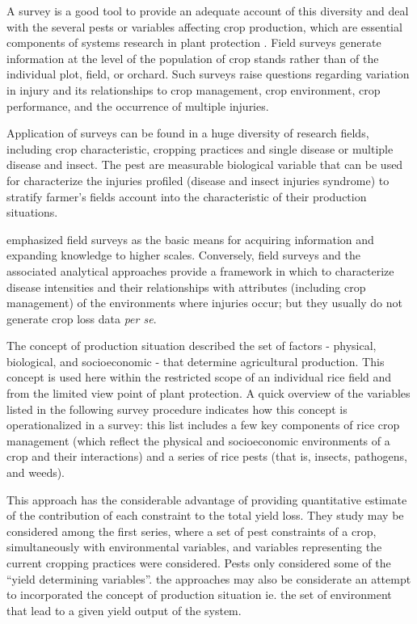 \documentclass[12pt, oneside]{report}
\begin{document}
A survey is a good tool to provide an adequate account of this diversity and deal with the several pests or variables affecting crop production, which are essential components of systems research in plant protection \citet{Zadoks:1979ts}. Field surveys generate information at the level of the population of crop stands rather than of the individual plot, field, or orchard. Such surveys raise questions regarding variation in injury and its relationships to crop management, crop environment, crop performance, and the occurrence of multiple injuries.

Application of surveys can be found in a huge diversity of research fields, including crop characteristic, cropping practices and single disease or multiple disease and insect. The pest are measurable biological variable that can be used for characterize the injuries profiled (disease and insect injuries syndrome) to stratify farmer's fields account into the characteristic of their production situations.

\cite{savary1995use} emphasized field surveys as the basic means for acquiring information and expanding knowledge to higher scales. Conversely, field surveys and the associated analytical approaches provide a framework in which to characterize disease intensities and their relationships with attributes (including crop management) of the environments where injuries occur; but they usually do not generate crop loss data \textit{per se}.

The concept of production situation described the set of factors - physical, biological, and socioeconomic - that determine agricultural production. This concept is used here within the restricted scope of an individual rice field and from the limited view point of plant protection. A quick overview of the variables listed in the following survey procedure indicates how this concept is operationalized in a survey: this list includes a few key components of rice crop management (which reflect the physical and socioeconomic environments of a crop and their interactions) and a series of rice pests (that is, insects, pathogens, and weeds).

This approach has the considerable advantage of providing quantitative estimate of the contribution of each constraint to the total yield loss. They study may be considered among the first series, where a set of pest constraints of a crop, simultaneously with environmental variables, and variables representing the current cropping practices were considered. Pests only considered some of the ``yield determining variables''. the approaches may also be considerate an attempt to incorporated the concept of production situation ie. the set of environment that lead to a given yield output of the system. 
\end{document}
